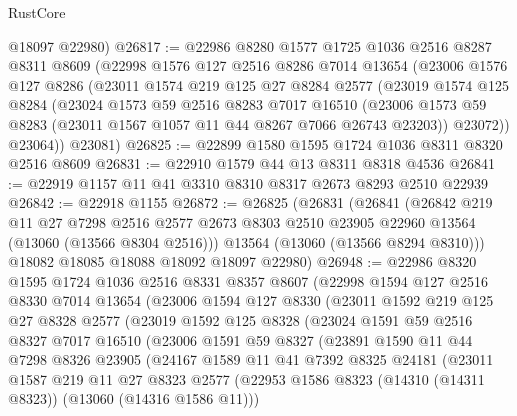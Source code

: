 \begin{lexlean}{RustCore}
\begin{coremodule}
      @18097
      @22980)
@26817 := @22986
    @8280
    @1577
    @1725
    @1036
    @2516
    @8287
    @8311
    @8609
    (@22998
      @1576
      @127
      @2516
      @8286
      @7014
      @13654
      (@23006
        @1576
        @127
        @8286
        (@23011
          @1574
          @219
          @125
          @27
          @8284
          @2577
          (@23019
            @1574
            @125
            @8284
            (@23024
              @1573
              @59
              @2516
              @8283
              @7017
              @16510
              (@23006 @1573 @59 @8283 (@23011 @1567 @1057 @11 @44 @8267 @7066 @26743 @23203))
              @23072))
          @23064))
      @23081)
@26825 := @22899 @1580 @1595 @1724 @1036 @8311 @8320 @2516 @8609
@26831 := @22910 @1579 @44 @13 @8311 @8318 @4536
@26841 := @22919 @1157 @11 @41 @3310 @8310 @8317 @2673 @8293 @2510 @22939
@26842 := @22918 @1155
@26872 := @26825
    (@26831
      (@26841
        (@26842
          @219
          @11
          @27
          @7298
          @2516
          @2577
          @2673
          @8303
          @2510
          @23905
          @22960
          @13564
          (@13060 (@13566 @8304 @2516)))
        @13564
        (@13060 (@13566 @8294 @8310)))
      @18082
      @18085
      @18088
      @18092
      @18097
      @22980)
@26948 := @22986
    @8320
    @1595
    @1724
    @1036
    @2516
    @8331
    @8357
    @8607
    (@22998
      @1594
      @127
      @2516
      @8330
      @7014
      @13654
      (@23006
        @1594
        @127
        @8330
        (@23011
          @1592
          @219
          @125
          @27
          @8328
          @2577
          (@23019
            @1592
            @125
            @8328
            (@23024
              @1591
              @59
              @2516
              @8327
              @7017
              @16510
              (@23006
                @1591
                @59
                @8327
                (@23891
                  @1590
                  @11
                  @44
                  @7298
                  @8326
                  @23905
                  (@24167
                    @1589
                    @11
                    @41
                    @7392
                    @8325
                    @24181
                    (@23011
                      @1587
                      @219
                      @11
                      @27
                      @8323
                      @2577
                      (@22953 @1586 @8323 (@14310 (@14311 @8323)) (@13060 (@14316 @1586 @11)))

\end{coremodule}
\end{lexlean}
